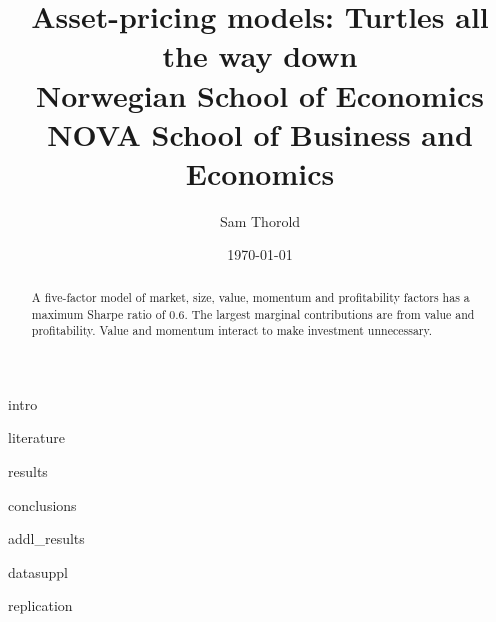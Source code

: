 \documentclass[a4paper, 12pt]{article}
\title{
  {Asset-pricing models: Turtles all the way down}\\
  {\large Norwegian School of Economics}\\
  {\large NOVA School of Business and Economics}
}
\author{Sam Thorold}
\date{\today}
\begin{document}
\maketitle

\begin{abstract}
  A five-factor model of
  market, size, value, momentum and profitability factors
  has a maximum Sharpe ratio of 0.6.
  The largest marginal contributions are from value and profitability.
  Value and momentum interact to make investment unnecessary.
\end{abstract}

{intro}

{literature}



{results}

{conclusions}

\printbibliography

\appendix

{addl_results}

{datasuppl}

{replication}
\end{document}
